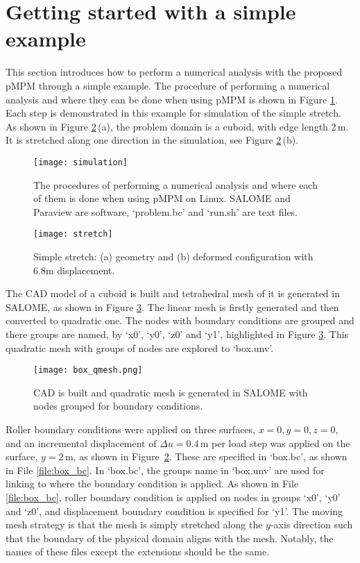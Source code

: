 \documentclass[10pt,a4paper]{article}
\begin{document}
\section{Getting started with a simple example}
\label{ch:start}

This section introduces how to perform a numerical analysis with the proposed pMPM through a simple example. The procedure of performing a numerical analysis and where they can be done when using pMPM is shown in Figure \ref{fig:simulation}. Each step is demonstrated in this example for simulation of the simple stretch. As shown in Figure \ref{fig:stretch_geo}\,(a), the problem domain is a cuboid, with edge length 2\,m. It is stretched along one direction in the simulation, see Figure \ref{fig:stretch_geo}\,(b).

\begin{figure}[!ht]
\centering
\texttt{[image: simulation]}
\caption{The procedures of performing a numerical analysis and where each of them is done when using pMPM on Linux. SALOME and Paraview are software, `problem.bc' and `run.sh' are text files.  }
\label{fig:simulation}
\end{figure}

\begin{figure}[!ht]
\centering
\texttt{[image: stretch]}
\caption{Simple stretch: (a) geometry and (b) deformed configuration with $6.8$m  displacement.}
\label{fig:stretch_geo}
\end{figure}

The CAD model of a cuboid is built and tetrahedral mesh of it is generated in SALOME, as shown in Figure \ref{fig:box_mesh}. The linear mesh is firstly generated and then converted to quadratic one. The nodes with boundary conditions are grouped and there groups are named, by `x0', `y0', `z0' and `y1', highlighted in Figure \ref{fig:box_mesh}. This quadratic mesh with groups of nodes are explored to `box.unv'. 

\begin{figure}[!ht]
\centering
\texttt{[image: box\_qmesh.png]}
\caption{CAD is built and quadratic mesh is generated in SALOME with nodes grouped for boundary conditions.}
\label{fig:box_mesh}
\end{figure}

Roller boundary conditions were applied on three surfaces, $x=0,y=0,z=0$, and an incremental displacement of $\Delta u=0.4$\,m per load step was applied on the surface, $y=2$\,m, as shown in Figure~\ref{fig:stretch_geo}. These are specified in `box.bc', as shown in File \ref{file:box_bc}. In `box.bc', the groups name in `box.unv' are used for linking to where the boundary condition is applied. As shown in File \ref{file:box_bc}, roller boundary condition is applied on nodes in groups `x0', `y0' and `z0', and displacement boundary condition is specified for `y1'. The moving mesh strategy is that the mesh is simply stretched along the $y$-axis direction such that the boundary of the physical domain aligns with the mesh. Notably, the names of these files except the extensions should be the same. 
\end{document}
